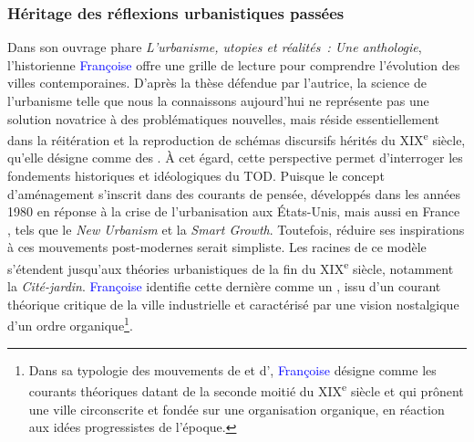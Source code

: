 \begin{refsegment}
\subsubsection*{Héritage des réflexions urbanistiques passées
    \label{chap1:tod-presentation-generale-origines-mouvements}
    }

Dans son ouvrage phare \textsl{L’urbanisme, utopies et réalités~: Une anthologie}, l’historienne \textcolor{blue}{Françoise} \textcolor{blue}{\textcite{choay_urbanisme_1965}} offre une grille de lecture pour comprendre l’évolution des villes contemporaines. D'après la thèse défendue par l'autrice, la science de l'urbanisme telle que nous la connaissons aujourd'hui ne représente pas une solution novatrice à des problématiques nouvelles, mais réside essentiellement dans la réitération et la reproduction de schémas discursifs hérités du XIX\textsuperscript{e} siècle, qu'elle désigne comme des . À cet égard, cette perspective permet d’interroger les fondements historiques et idéologiques du \acrshort{TOD}. Puisque le concept d'aménagement s'inscrit dans des courants de pensée, développés dans les années 1980 en réponse à la crise de l'urbanisation aux États-Unis, mais aussi en France \textcolor{blue}{\autocite[11]{lefebvre_droit_1967}}, tels que le \textsl{New Urbanism} et la \textsl{Smart Growth}. Toutefois, réduire ses inspirations à ces mouvements post-modernes serait simpliste. Les racines de ce modèle s’étendent jusqu’aux théories urbanistiques de la fin du XIX\textsuperscript{e} siècle, notamment la \textsl{Cité-jardin}. \textcolor{blue}{Françoise} \textcolor{blue}{\textcite[259]{choay_urbanisme_1965}} identifie cette dernière comme un , issu d'un courant théorique critique de la ville industrielle et caractérisé par une vision nostalgique d'un ordre organique\footnote{
    Dans sa typologie des mouvements de  et d', \textcolor{blue}{Françoise} \textcolor{blue}{\textcite[277]{choay_urbanisme_1965}} désigne comme  les courants théoriques datant de la seconde moitié du XIX\textsuperscript{e} siècle et qui prônent une ville circonscrite et fondée sur une organisation organique, en réaction aux idées progressistes de l'époque.
}.%


\end{refsegment}
